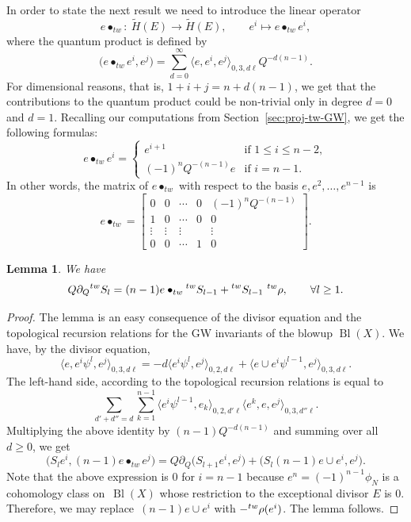 \documentclass[10pt,a4paper]{article}
\numberwithin{equation}{section}
\newtheorem{Lemma}[Theorem]{Lemma}
\newcommand{\leftexp}[2]{{\vphantom{#2}}^{#1}{#2}}
\begin{document}
In order to state the next result we need to introduce the linear
operator
\[
e\bullet_{tw}\colon\ \widetilde{H}(E)\to \widetilde{H}(E),\qquad
e^i\mapsto e\bullet_{tw} e^i,
\]
where the quantum product is defined by
\[
\big(e\bullet_{tw} e^i,e^j\big) =
\sum_{d=0}^\infty
\big\langle e, e^i, e^j\big\rangle_{0,3,d\ell}
Q^{-d(n-1)}.
\]
For dimensional reasons, that is, $1+i+j= n+d(n-1)$, we get that the
contributions to the quantum product could be non-trivial only in
degree $d=0$ and $d=1$. Recalling our computations from Section~\ref{sec:proj-tw-GW}, we get the following formulas:
\[
e\bullet_{tw} e^i =
\begin{cases}
e^{i+1} & \mbox{if } 1\leq i\leq n-2, \\
(-1)^n Q^{-(n-1)} e & \mbox{if } i=n-1.
\end{cases}
\]
In other words, the matrix of $e\bullet_{tw}$ with respect to the
basis $e,e^2,\dots,e^{n-1}$ is
\[
e\bullet_{tw} =
\begin{bmatrix}
0 & 0 & \cdots & 0 & (-1)^n Q^{-(n-1)} \\
1 & 0 & \cdots & 0 & 0 \\
\vdots & \vdots &\vdots & & \vdots \\
0 & 0 & \cdots & 1 & 0
\end{bmatrix}.
\]
\begin{Lemma}\label{le:tw-period-div_eq}
We have
\[
Q\partial_Q
\leftexp{tw}{S}_l = (n-1) e\bullet_{tw}
\leftexp{tw}{S}_{l-1}+
\leftexp{tw}{S}_{l-1} \
\leftexp{tw}{\rho}, \qquad \forall l\geq 1.
\]
\end{Lemma}
\begin{proof}
The lemma is an easy consequence of the divisor equation and the
topological recursion relations for the GW invariants of the blowup $\operatorname{Bl}(X)$. We have, by the divisor equation,
\[
\big\langle e, e^i \psi^l, e^j\big\rangle_{0,3,d\ell} =
-d \big\langle e^i \psi^l, e^j\big\rangle_{0,2,d\ell} +
\big\langle e\cup e^{i} \psi^{l-1}, e^j\big\rangle_{0,3,d\ell}.
\]
The left-hand side, according to the topological recursion relations is equal to
\[
\sum_{d'+d''=d}
\sum_{k=1}^{n-1}
\big\langle e^i \psi^{l-1}, e_k\big\rangle_{0,2,d'\ell}
\big\langle e^k, e,e^j\big\rangle_{0,3,d''\ell}.
\]
Multiplying the above identity by $(n-1) Q^{-d(n-1)}$ and summing over
all $d\geq 0$, we get
\[
\big(S_l e^i, (n-1)e\bullet_{tw} e^j\big) = Q\partial_Q \big(S_{l+1} e^i,e^j\big)+
\big(S_l (n-1)e\cup e^i, e^j\big).
\]
Note that the above expression is 0 for $i=n-1$ because
$e^n=(-1)^{n-1}\phi_N$ is a cohomology class on~$\operatorname{Bl}(X)$ whose
restriction to the exceptional divisor $E$ is $0$. Therefore, we may
replace~${(n-1)e\cup e^i}$ with $-\leftexp{tw}{\rho}(e^i)$. The lemma
follows. \end{proof}
\end{document}
